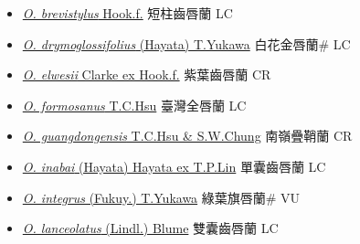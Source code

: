 \begin{itemize}
  \begin{itemize}
        \item[] \href{http://www.theplantlist.org/tpl1.1/search?q=Odontochilus+brevistylus}{\textit{O. brevistylus} Hook.f.}   短柱齒唇蘭 LC
        \item[] \href{http://www.theplantlist.org/tpl1.1/search?q=Odontochilus+drymoglossifolius}{\textit{O. drymoglossifolius} (Hayata) T.Yukawa}     白花金唇蘭\# LC
        \item[] \href{http://www.theplantlist.org/tpl1.1/search?q=Odontochilus+elwesii}{\textit{O. elwesii} Clarke ex Hook.f.}   紫葉齒唇蘭 CR
        \item[] \href{http://www.theplantlist.org/tpl1.1/search?q=Odontochilus+formosanus}{\textit{O. formosanus} T.C.Hsu}   臺灣全唇蘭 LC
        \item[] \href{http://www.theplantlist.org/tpl1.1/search?q=Odontochilus+guangdongensis}{\textit{O. guangdongensis} T.C.Hsu \& S.W.Chung}   南嶺疊鞘蘭 CR
        \item[] \href{http://www.theplantlist.org/tpl1.1/search?q=Odontochilus+inabai}{\textit{O. inabai} (Hayata) Hayata ex T.P.Lin}   單囊齒唇蘭 LC
        \item[] \href{http://www.theplantlist.org/tpl1.1/search?q=Odontochilus+integrus}{\textit{O. integrus} (Fukuy.) T.Yukawa}     綠葉旗唇蘭\# VU
        \item[] \href{http://www.theplantlist.org/tpl1.1/search?q=Odontochilus+lanceolatus}{\textit{O. lanceolatus} (Lindl.) Blume}   雙囊齒唇蘭 LC

\end{itemize}
\end{itemize}
